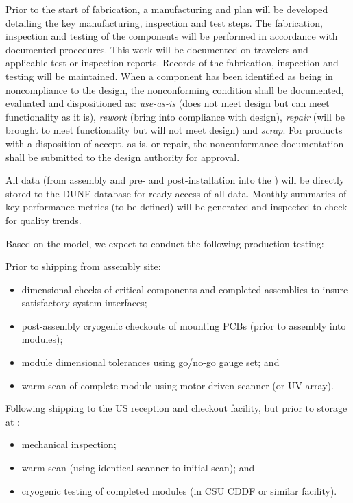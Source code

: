 
Prior to the start of fabrication, a manufacturing and  plan will be developed detailing the key manufacturing, inspection and test steps.  The fabrication, inspection and testing of the components will be performed in accordance with documented procedures. This work will be documented on travelers and applicable test or inspection reports. Records of the fabrication, inspection and testing will be maintained. When a component has been identified as being in noncompliance to the design, the nonconforming condition shall be documented, evaluated and dispositioned as: {\it use-as-is} (does not meet design but can meet functionality as it is), {\it rework} (bring into compliance with design), {\it repair} (will be brought to meet functionality but will not meet design) and {\it scrap}. For products with a disposition of accept, as is, or repair, the nonconformance documentation shall be submitted to the design authority for approval.   

All  data  (from assembly and pre- and post-installation into the ) will be directly stored to the DUNE database for ready access of all  data.  Monthly summaries of key performance metrics (to be defined) will be generated and inspected to check for quality trends.

Based on the  model, we expect to conduct the following production testing:

Prior to shipping from assembly site:
\begin{itemize}
\item dimensional checks of critical components and completed assemblies to insure satisfactory system interfaces;
\item post-assembly cryogenic checkouts of  mounting PCBs (prior to assembly into  modules);
\item module dimensional tolerances using go/no-go gauge set; and
\item warm scan of complete module using motor-driven  scanner (or UV   array).
\end{itemize}

Following shipping to the US reception and checkout facility, but prior to storage at :
\begin{itemize}
\item mechanical inspection;
\item warm scan (using identical scanner to initial scan); and
\item cryogenic testing of completed modules (in CSU CDDF or similar facility).
\end{itemize}

